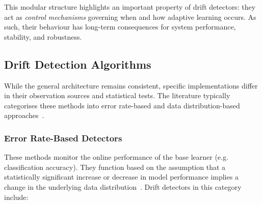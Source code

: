 This modular structure highlights an important property of drift detectors: they act as \emph{control mechanisms} governing when and how adaptive learning occurs. As such, their behaviour has long-term consequences for system performance, stability, and robustness.

\subsection{Drift Detection Algorithms}
While the general architecture remains consistent, specific implementations differ in their observation sources and statistical tests. The literature typically categorises these methods into error rate-based and data distribution-based approaches~\cite{Lu_2018}.

\subsubsection{Error Rate-Based Detectors}
These methods monitor the online performance of the base learner (e.g. classification accuracy). They function based on the assumption that a statistically significant increase or decrease in model performance implies a change in the underlying data distribution~\cite{Lu_2018}. Drift detectors in this category include:

